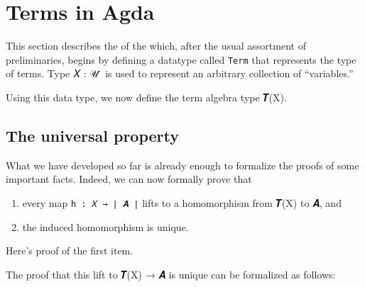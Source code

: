 \documentclass[a4paper,USenglish,cleveref,autoref,thm-restate]{lipics-v2019}
\begin{document}
\section{Terms in Agda}\label{sec:terms-in-agda}
This section describes the \termsmodule of the \agdaualib which, after the usual assortment of preliminaries, begins by defining
a datatype called \texttt{Term} that represents the type of terms. Type \ab 𝑋 : \ab 𝒰 ̇ is used to represent an arbitrary collection of ``variables.''
\begin{code}\end{code}
Using this data type, we now define the term algebra type 𝑻(X).
\begin{code}\end{code}

\subsection{The universal property}\label{the-universal-property}
What we have developed so far is already enough to formalize the proofs of some important facts. Indeed, we can now formally prove that 
\begin{enumerate}
\item every map \texttt{h\ :\ 𝑋\ →\ ∣\ 𝑨\ ∣} lifts to a homomorphism from 𝑻(X) to 𝑨, and
\item the induced homomorphism is unique.
\end{enumerate}
Here's proof of the first item. %
\begin{code}\end{code}
The proof that this lift to 𝑻(X) → 𝑨 is unique can be formalized as follows:
\begin{code}\end{code}

\end{document}
